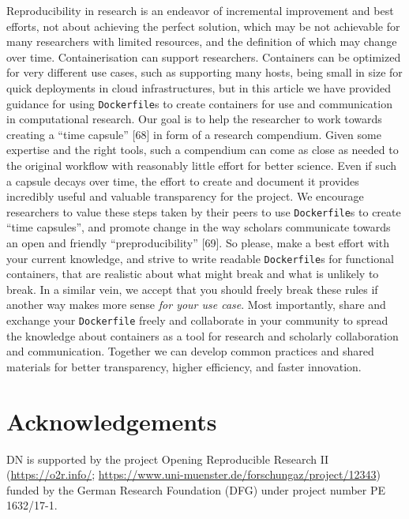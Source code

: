 \documentclass[10pt,letterpaper]{article}
\begin{document}
Reproducibility in research is an endeavor of incremental improvement
and best efforts, not about achieving the perfect solution, which may be
not achievable for many researchers with limited resources, and the
definition of which may change over time. Containerisation can support
researchers. Containers can be optimized for very different use cases,
such as supporting many hosts, being small in size for quick deployments
in cloud infrastructures, but in this article we have provided guidance
for using \texttt{Dockerfile}s to create containers for use and
communication in computational research. Our goal is to help the
researcher to work towards creating a ``time capsule'' {[}68{]} in form
of a research compendium. Given some expertise and the right tools, such
a compendium can come as close as needed to the original workflow with
reasonably little effort for better science. Even if such a capsule
decays over time, the effort to create and document it provides
incredibly useful and valuable transparency for the project. We
encourage researchers to value these steps taken by their peers to use
\texttt{Dockerfile}s to create ``time capsules'', and promote change in
the way scholars communicate towards an open and friendly
``preproducibility'' {[}69{]}. So please, make a best effort with your
current knowledge, and strive to write readable \texttt{Dockerfile}s for
functional containers, that are realistic about what might break and
what is unlikely to break. In a similar vein, we accept that you should
freely break these rules if another way makes more sense \emph{for your
use case}. Most importantly, share and exchange your \texttt{Dockerfile}
freely and collaborate in your community to spread the knowledge about
containers as a tool for research and scholarly collaboration and
communication. Together we can develop common practices and shared
materials for better transparency, higher efficiency, and faster
innovation.

\hypertarget{acknowledgements}{%
\section*{Acknowledgements}\label{acknowledgements}}

DN is supported by the project Opening Reproducible Research II
(\href{https://o2r.info/}{https://o2r.info/};
\href{https://www.uni-muenster.de/forschungaz/project/12343}{https://www.uni-muenster.de/forschungaz/project/12343})
funded by the German Research Foundation (DFG) under project number PE
1632/17-1.
\end{document}
